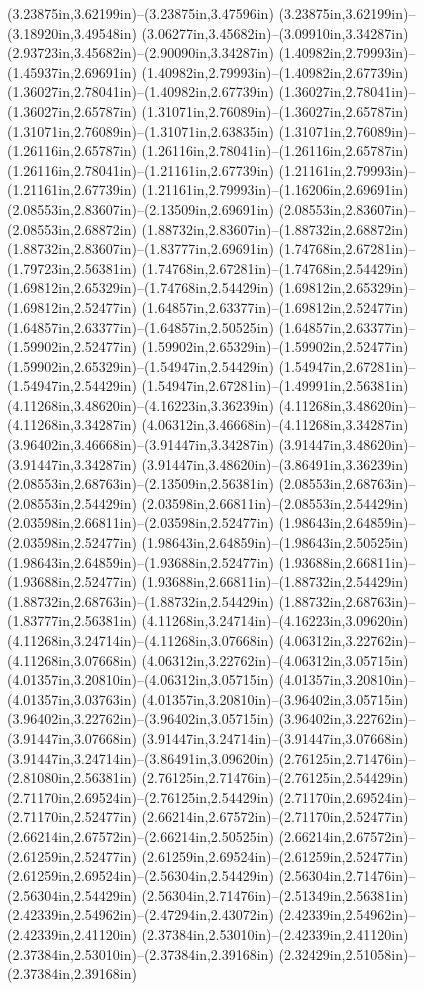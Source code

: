 (3.23875in,3.62199in)--(3.23875in,3.47596in) (3.23875in,3.62199in)--(3.18920in,3.49548in) (3.06277in,3.45682in)--(3.09910in,3.34287in) (2.93723in,3.45682in)--(2.90090in,3.34287in) (1.40982in,2.79993in)--(1.45937in,2.69691in) (1.40982in,2.79993in)--(1.40982in,2.67739in) (1.36027in,2.78041in)--(1.40982in,2.67739in) (1.36027in,2.78041in)--(1.36027in,2.65787in) (1.31071in,2.76089in)--(1.36027in,2.65787in) (1.31071in,2.76089in)--(1.31071in,2.63835in) (1.31071in,2.76089in)--(1.26116in,2.65787in) (1.26116in,2.78041in)--(1.26116in,2.65787in) (1.26116in,2.78041in)--(1.21161in,2.67739in) (1.21161in,2.79993in)--(1.21161in,2.67739in) (1.21161in,2.79993in)--(1.16206in,2.69691in) (2.08553in,2.83607in)--(2.13509in,2.69691in) (2.08553in,2.83607in)--(2.08553in,2.68872in) (1.88732in,2.83607in)--(1.88732in,2.68872in) (1.88732in,2.83607in)--(1.83777in,2.69691in) (1.74768in,2.67281in)--(1.79723in,2.56381in) (1.74768in,2.67281in)--(1.74768in,2.54429in) (1.69812in,2.65329in)--(1.74768in,2.54429in) (1.69812in,2.65329in)--(1.69812in,2.52477in) (1.64857in,2.63377in)--(1.69812in,2.52477in) (1.64857in,2.63377in)--(1.64857in,2.50525in) (1.64857in,2.63377in)--(1.59902in,2.52477in) (1.59902in,2.65329in)--(1.59902in,2.52477in) (1.59902in,2.65329in)--(1.54947in,2.54429in) (1.54947in,2.67281in)--(1.54947in,2.54429in) (1.54947in,2.67281in)--(1.49991in,2.56381in) (4.11268in,3.48620in)--(4.16223in,3.36239in) (4.11268in,3.48620in)--(4.11268in,3.34287in) (4.06312in,3.46668in)--(4.11268in,3.34287in) (3.96402in,3.46668in)--(3.91447in,3.34287in) (3.91447in,3.48620in)--(3.91447in,3.34287in) (3.91447in,3.48620in)--(3.86491in,3.36239in) (2.08553in,2.68763in)--(2.13509in,2.56381in) (2.08553in,2.68763in)--(2.08553in,2.54429in) (2.03598in,2.66811in)--(2.08553in,2.54429in) (2.03598in,2.66811in)--(2.03598in,2.52477in) (1.98643in,2.64859in)--(2.03598in,2.52477in) (1.98643in,2.64859in)--(1.98643in,2.50525in) (1.98643in,2.64859in)--(1.93688in,2.52477in) (1.93688in,2.66811in)--(1.93688in,2.52477in) (1.93688in,2.66811in)--(1.88732in,2.54429in) (1.88732in,2.68763in)--(1.88732in,2.54429in) (1.88732in,2.68763in)--(1.83777in,2.56381in) (4.11268in,3.24714in)--(4.16223in,3.09620in) (4.11268in,3.24714in)--(4.11268in,3.07668in) (4.06312in,3.22762in)--(4.11268in,3.07668in) (4.06312in,3.22762in)--(4.06312in,3.05715in) (4.01357in,3.20810in)--(4.06312in,3.05715in) (4.01357in,3.20810in)--(4.01357in,3.03763in) (4.01357in,3.20810in)--(3.96402in,3.05715in) (3.96402in,3.22762in)--(3.96402in,3.05715in) (3.96402in,3.22762in)--(3.91447in,3.07668in) (3.91447in,3.24714in)--(3.91447in,3.07668in) (3.91447in,3.24714in)--(3.86491in,3.09620in) (2.76125in,2.71476in)--(2.81080in,2.56381in) (2.76125in,2.71476in)--(2.76125in,2.54429in) (2.71170in,2.69524in)--(2.76125in,2.54429in) (2.71170in,2.69524in)--(2.71170in,2.52477in) (2.66214in,2.67572in)--(2.71170in,2.52477in) (2.66214in,2.67572in)--(2.66214in,2.50525in) (2.66214in,2.67572in)--(2.61259in,2.52477in) (2.61259in,2.69524in)--(2.61259in,2.52477in) (2.61259in,2.69524in)--(2.56304in,2.54429in) (2.56304in,2.71476in)--(2.56304in,2.54429in) (2.56304in,2.71476in)--(2.51349in,2.56381in) (2.42339in,2.54962in)--(2.47294in,2.43072in) (2.42339in,2.54962in)--(2.42339in,2.41120in) (2.37384in,2.53010in)--(2.42339in,2.41120in) (2.37384in,2.53010in)--(2.37384in,2.39168in) (2.32429in,2.51058in)--(2.37384in,2.39168in) 